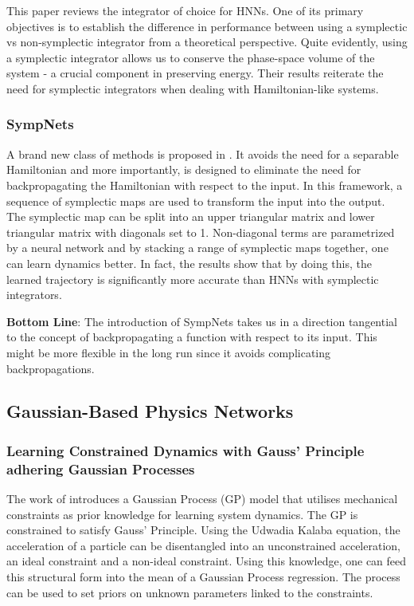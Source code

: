 \documentclass{article}
\begin{document}
This paper \cite{zhu_deep_2020} reviews the integrator of choice for HNNs. One of its primary objectives is to establish the difference in performance between using a symplectic vs non-symplectic integrator from a theoretical perspective. Quite evidently, using a symplectic integrator allows us to conserve the phase-space volume of the system - a crucial component in preserving energy. Their results reiterate the need for symplectic integrators when dealing with Hamiltonian-like systems.

\subsubsection{SympNets}

A brand new class of methods is proposed in \cite{jin_sympnets_2020}. It avoids the need for a separable Hamiltonian and more importantly, is designed to eliminate the need for backpropagating the Hamiltonian with respect to the input. In this framework, a sequence of symplectic maps are used to transform the input into the output. The symplectic map can be split into an upper triangular matrix and lower triangular matrix with diagonals set to 1. Non-diagonal terms are parametrized by a neural network and by stacking a range of symplectic maps together, one can learn dynamics better. In fact, the results show that by doing this, the learned trajectory is significantly more accurate than HNNs with symplectic integrators.

\textbf{Bottom Line}: The introduction of SympNets takes us in a direction tangential to the concept of backpropagating a function with respect to its input. This might be more flexible in the long run since it avoids complicating backpropagations. 

\subsection{Gaussian-Based Physics Networks}
\subsubsection{Learning Constrained Dynamics with Gauss' Principle adhering Gaussian Processes}

The work of \cite{geist_learning_2020} introduces a Gaussian Process (GP) model that utilises mechanical constraints as prior knowledge for learning system dynamics. The GP is constrained to satisfy Gauss' Principle. Using the Udwadia Kalaba equation, the acceleration of a particle can be disentangled into an unconstrained acceleration, an ideal constraint and a non-ideal constraint. Using this knowledge, one can feed this structural form into the mean of a Gaussian Process regression. The process can be used to set priors on unknown parameters linked to the constraints.
\end{document}
